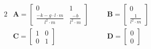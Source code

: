 \begin{alignat}{2}
          & \bm{A} =
    \begin{bmatrix}
        0                                        & 1                     \\
        \frac{-k -g \cdot l \cdot m}{l^2\cdot m} & \frac{-b}{l^2\cdot m}
    \end{bmatrix}
    \quad &                          &
    \bm{B} =    \begin{bmatrix}
                    0 \\
                    \frac{1}{l^2 \cdot m}
                \end{bmatrix}   \\
          & \bm{C} = \begin{bmatrix}
                         1 & 0 \\
                         0 & 1
                     \end{bmatrix}
    \quad &                          &
    \bm{D} =    \begin{bmatrix}
                    0 \\
                    0
                \end{bmatrix}
\end{alignat}